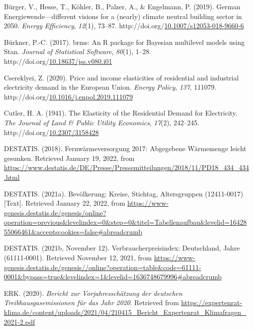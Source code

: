 \documentclass[12pt,twoside]{reedthesis}
\newlength{\cslhangindent}
\newenvironment{CSLReferences}[2] %
 {%
  \setlength{\parindent}{0pt}
  \ifodd #1 \everypar{\setlength{\hangindent}{\cslhangindent}}\ignorespaces\fi
  \ifnum #2 > 0
  \setlength{\parskip}{#2\baselineskip}
  \fi
 }%
 {}
\begin{document}
\begin{CSLReferences}{1}{0}
\leavevmode{}%
Bürger, V., Hesse, T., Köhler, B., Palzer, A., \& Engelmann, P. (2019). German Energiewende---different visions for a (nearly) climate neutral building sector in 2050. \emph{Energy Efficiency}, \emph{12}(1), 73--87. http://doi.org/\href{https://doi.org/10.1007/s12053-018-9660-6}{10.1007/s12053-018-9660-6}

\leavevmode{}%
Bürkner, P.-C. (2017). brms: An R package for Bayesian multilevel models using Stan. \emph{Journal of Statistical Software}, \emph{80}(1), 1--28. http://doi.org/\href{https://doi.org/10.18637/jss.v080.i01}{10.18637/jss.v080.i01}

\leavevmode{}%
Csereklyei, Z. (2020). Price and income elasticities of residential and industrial electricity demand in the European Union. \emph{Energy Policy}, \emph{137}, 111079. http://doi.org/\href{https://doi.org/10.1016/j.enpol.2019.111079}{10.1016/j.enpol.2019.111079}

\leavevmode{}%
Cutler, H. A. (1941). The Elasticity of the Residential Demand for Electricity. \emph{The Journal of Land \& Public Utility Economics}, \emph{17}(2), 242--245. http://doi.org/\href{https://doi.org/10.2307/3158428}{10.2307/3158428}

\leavevmode{}%
DESTATIS. (2018). Fernwärmeversorgung 2017: Abgegebene Wärmemenge leicht gesunken. Retrieved January 19, 2022, from \url{https://www.destatis.de/DE/Presse/Pressemitteilungen/2018/11/PD18_434_434.html}

\leavevmode{}%
DESTATIS. (2021a). Bevölkerung: Kreise, Stichtag, Altersgruppen (12411-0017) {[}Text{]}. Retrieved January 22, 2022, from \url{https://www-genesis.destatis.de/genesis/online?operation=previous\&levelindex=0\&step=0\&titel=Tabellenaufbau\&levelid=1642855066461\&acceptscookies=false\#abreadcrumb}

\leavevmode{}%
DESTATIS. (2021b, November 12). Verbraucherpreisindex: Deutschland, Jahre (61111-0001). Retrieved November 12, 2021, from \url{https://www-genesis.destatis.de/genesis//online?operation=table\&code=61111-0001\&bypass=true\&levelindex=1\&levelid=1636748679996\#abreadcrumb}

\leavevmode{}%
ERK. (2020). \emph{Bericht zur Vorjahresschätzung der deutschen Treibhausgasemissionen für das Jahr 2020}. Retrieved from \url{https://expertenrat-klima.de/content/uploads/2021/04/210415_Bericht_Expertenrat_Klimafragen_2021-2.pdf}


\end{CSLReferences}
\end{document}

